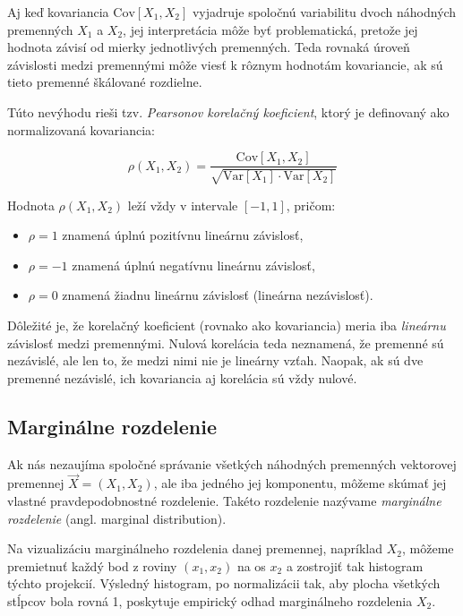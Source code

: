 Aj keď kovariancia $\mathrm{Cov}[X_1, X_2]$ vyjadruje spoločnú variabilitu dvoch náhodných premenných $X_1$ a $X_2$, jej interpretácia môže byť problematická, pretože jej hodnota závisí od mierky jednotlivých premenných. Teda rovnaká úroveň závislosti medzi premennými môže viesť k rôznym hodnotám kovariancie, ak sú tieto premenné škálované rozdielne.

Túto nevýhodu rieši tzv. \textit{Pearsonov korelačný koeficient}, ktorý je definovaný ako normalizovaná kovariancia:

\begin{equation}
\rho(X_1, X_2) = \frac{\mathrm{Cov}[X_1, X_2]}{\sqrt{\mathrm{Var}[X_1] \cdot \mathrm{Var}[X_2]}}
\end{equation}

Hodnota $\rho(X_1, X_2)$ leží vždy v intervale $[-1, 1]$, pričom:

\begin{itemize}
  \item $\rho = 1$ znamená úplnú pozitívnu lineárnu závislosť,
  \item $\rho = -1$ znamená úplnú negatívnu lineárnu závislosť,
  \item $\rho = 0$ znamená žiadnu lineárnu závislosť (lineárna nezávislosť).
\end{itemize}

Dôležité je, že korelačný koeficient (rovnako ako kovariancia) meria iba \textit{lineárnu} závislosť medzi premennými. Nulová korelácia teda neznamená, že premenné sú nezávislé, ale len to, že medzi nimi nie je lineárny vzťah. Naopak, ak sú dve premenné nezávislé, ich kovariancia aj korelácia sú vždy nulové.

\subsection{Marginálne rozdelenie}\label{subsec:marginal_dist}

Ak nás nezaujíma spoločné správanie všetkých náhodných premenných vektorovej premennej $\vec{X} = (X_1, X_2)$, ale iba jedného jej komponentu, môžeme skúmať jej vlastné pravdepodobnostné rozdelenie. Takéto rozdelenie nazývame \textit{marginálne rozdelenie} (angl. marginal distribution).

Na vizualizáciu marginálneho rozdelenia danej premennej, napríklad $X_2$, môžeme premietnuť každý bod z roviny $(x_1, x_2)$ na os $x_2$ a zostrojiť tak histogram týchto projekcií. Výsledný histogram, po normalizácii tak, aby plocha všetkých stĺpcov bola rovná 1, poskytuje empirický odhad marginálneho rozdelenia $X_2$.

